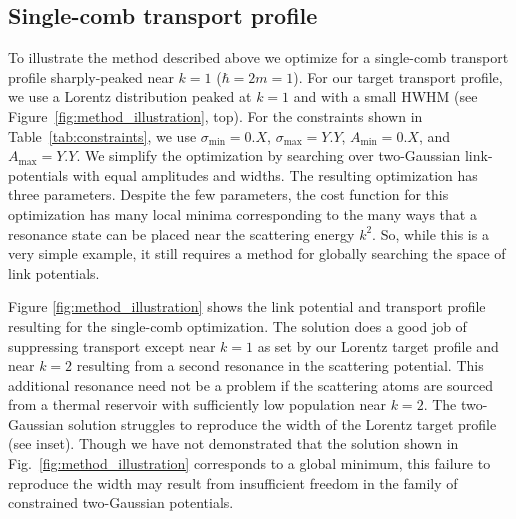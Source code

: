 \documentclass[twocolumn,amsmath,amssymb,showpacs,prl,superscriptaddress,aps]{revtex4-1}
\begin{document}
\subsection{Single-comb transport profile}
To illustrate the method described above we optimize for a single-comb transport profile sharply-peaked near $k=1$ ($\hbar=2m=1$). For our target transport profile, we use a Lorentz distribution peaked at $k=1$ and with a small HWHM (see Figure~\ref{fig:method_illustration}, top). For the constraints shown in Table~\ref{tab:constraints}, we use $\sigma_{\mathrm{min}}=0.X$, $\sigma_{\mathrm{max}}=Y.Y$, $A_{\mathrm{min}}=0.X$, and $A_{\mathrm{max}}=Y.Y$. We simplify the optimization by searching over two-Gaussian link-potentials with equal amplitudes and widths. The resulting optimization has three parameters. Despite the few parameters, the cost function for this optimization has many local minima corresponding to the many ways that a resonance state can be placed near the scattering energy $k^2$. So, while this is a very simple example, it still requires a method for globally searching the space of link potentials.

Figure \ref{fig:method_illustration} shows the link potential and transport profile resulting for the single-comb optimization. The solution does a good job of suppressing transport except near $k=1$ as set by our Lorentz target profile and near $k=2$ resulting from a second resonance in the scattering potential. This additional resonance need not be a problem if the scattering atoms are sourced from a thermal reservoir with sufficiently low population near $k=2$. The two-Gaussian solution struggles to reproduce the width of the Lorentz target profile (see inset). Though we have not demonstrated that the solution shown in Fig.~\ref{fig:method_illustration} corresponds to a global minimum, this failure to reproduce the width may result from insufficient freedom in the family of constrained two-Gaussian potentials.
\end{document}
